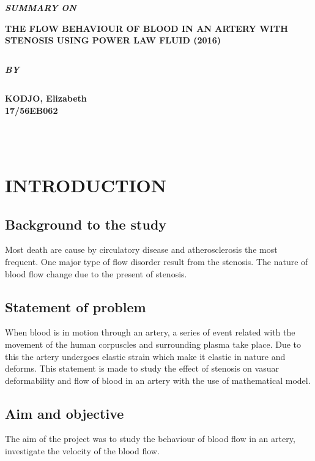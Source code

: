 \documentclass[12pt]{report}
\begin{document}
	\clearpage
	\thispagestyle{empty}
	\begin{center}
		\textbf{\itshape SUMMARY ON}
	\end{center} 
	\begin{center}
		{\bf \Large THE FLOW BEHAVIOUR OF BLOOD IN AN ARTERY WITH STENOSIS USING POWER LAW FLUID (2016)}
	\end{center}
	$$$$
	\vspace{3cm}
	\begin{center}
		\textbf{\itshape BY}
	\end{center} 
	$$$$
	\vspace{2cm}
	\begin{center}
		{\bf KODJO, Elizabeth\\
			17/56EB062}
	\end{center}
	$$$$
	\\ \\
	\newpage
	
	\chapter{INTRODUCTION}
	\section{Background to the study}
	Most death are cause by circulatory disease and atherosclerosis the most frequent. One major type of flow disorder result from the stenosis. The nature of blood flow change due to the present of stenosis.
	
	
	\section{Statement of problem}
	When blood is in motion through an artery, a series of event related with the movement of the human corpuscles and surrounding plasma take place. Due to this the artery undergoes elastic strain which make it elastic in nature and deforms. This statement is made to study the effect of stenosis on vasuar deformability and flow of blood in an artery with the use of mathematical model.
	
	
	\section{Aim and objective}
	The aim of the project was to study the behaviour of blood flow in an artery, investigate the velocity of the blood flow.
	
\end{document}
